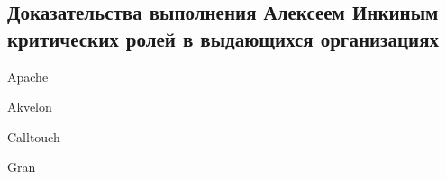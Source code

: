 \subsection{%
    Доказательства выполнения Алексеем Инкиным критических ролей в выдающихся организациях%
}
\label{subsec:Role}

{Apache}

\pagebreak

{Akvelon}

\pagebreak

{Calltouch}

\pagebreak

{Gran}

\pagebreak
